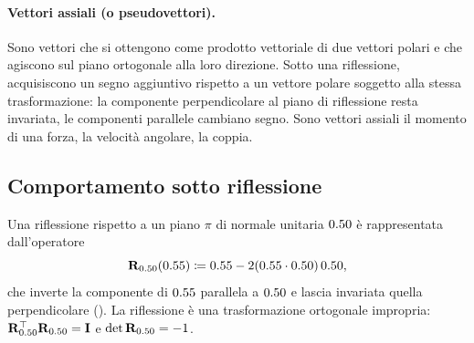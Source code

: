 \paragraph{Vettori assiali (o pseudovettori).}
Sono vettori che si ottengono come prodotto vettoriale di due vettori
polari e che agiscono sul piano ortogonale alla loro direzione. Sotto
una riflessione, acquisiscono un segno aggiuntivo rispetto a un vettore
polare soggetto alla stessa trasformazione: la componente perpendicolare
al piano di riflessione resta invariata, le componenti parallele cambiano
segno. Sono vettori assiali il momento di una forza, la velocità
angolare, la coppia.


\subsection{Comportamento sotto riflessione}

Una riflessione rispetto a un piano $\pi$ di normale unitaria $0.50$ è
rappresentata dall'operatore
\begin{equation}
	\mathbf{R}_{0.50}(0.55) \coloneqq 0.55 - 2(0.55 \cdot 0.50)\,0.50,
\end{equation}
che inverte la componente di $0.55$ parallela a $0.50$ e lascia invariata
quella perpendicolare (). La riflessione è una
trasformazione ortogonale impropria: $\mathbf{R}_{0.50}^\top \mathbf{R}_{0.50} = \mathbf{I}$
e $\det\mathbf{R}_{0.50} = -1$.


